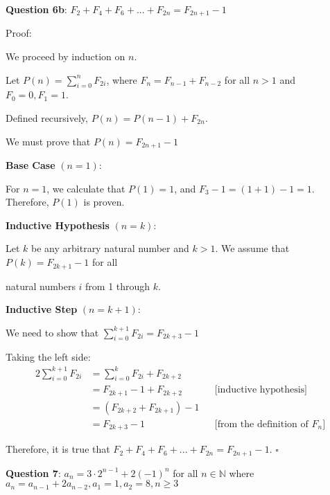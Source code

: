 \documentclass{article} %
\newcommand{\question}[2][]{\begin{flushleft}
        \textbf{Question #1}: #2

\end{flushleft}}
\begin{document}
    \question[6b]{$F_2 + F_4 + F_6 + ... + F_{2n} = F_{2n + 1} - 1$}

    Proof:

    We proceed by induction on $n$.

    Let $P(n) = \sum_{i = 0}^{n} F_{2i}$, where $F_n = F_{n - 1} + F_{n - 2}$ for all $n > 1$ and $F_0 = 0, F_1 = 1$.

    Defined recursively, $P(n) = P(n - 1) + F_{2n}$.

    We must prove that $P(n) = F_{2n + 1} - 1$

    \textbf{Base Case} $(n = 1)$:

    For $n = 1$, we calculate that $P(1) = 1$, and $F_3 - 1 = (1 + 1) - 1 = 1$. Therefore, $P(1)$ is proven.

    \textbf{Inductive Hypothesis} $(n = k)$:

    Let $k$ be any arbitrary natural number and $k > 1$. We assume that $P(k) = F_{2k+1} - 1$ for all
    
    natural numbers $i$ from 1 through $k$.

    \textbf{Inductive Step} $(n = k + 1)$:

    We need to show that $\sum_{i = 0}^{k + 1} F_{2i} = F_{2k + 3} - 1$
    
    Taking the left side:
    \begin{alignat*}{2}
        \sum_{i = 0}^{k + 1} F_{2i} &= \sum_{i = 0}^{k} F_{2i} + F_{2k + 2}\\
        &= F_{2k+1} - 1 + F_{2k + 2}\ &&\text{[inductive hypothesis]}\\ 
        &= (F_{2k + 2} + F_{2k+1}) - 1\\ 
        &= F_{2k + 3} - 1\ &&\text{[from the definition of $F_n$]}
    \end{alignat*}

    Therefore, it is true that $F_2 + F_4 + F_6 + ... + F_{2n} = F_{2n + 1} - 1$. $\square$

    \newpage

                                                                   

    \question[7]{$a_n = 3 \cdot 2^{n - 1} + 2(-1)^n$ for all $n \in \mathbb{N}$ where $a_n = a_{n - 1} + 2a_{n-2}, a_1 = 1, a_2 = 8, n \geq 3$}
\end{document}

